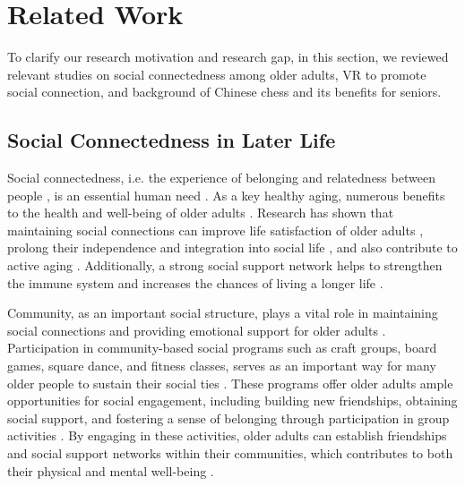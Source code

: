 \section{Related Work}
To clarify our research motivation and research gap, in this section, we reviewed relevant studies on social connectedness among older adults, VR to promote social connection, and background of Chinese chess and its benefits for seniors.

\subsection{Social Connectedness in Later Life}

Social connectedness, i.e. the experience of belonging and relatedness between people \cite{van2009social}, is an essential human need \cite{easton2013investigation}. As a key  healthy aging,   numerous benefits to the health and well-being of older adults \cite{ashida2008differential}. Research has shown that maintaining social connections can improve life satisfaction of older adults \cite{o2017definition}, prolong their independence and integration into social life \cite{michael2001living}, and also contribute to active aging \cite{annele2019definitions}. Additionally, a strong social support network helps to strengthen the immune system and increases the chances of living a longer life \cite{holt2010social}.

Community, as an important social structure, plays a vital role in maintaining social connections and providing emotional support for older adults \cite{brossoie2003community,markle2018community,salman2021community}. Participation in community-based social programs such as craft groups, board games, square dance, and fitness classes, serves as an important way for many older people to sustain their social ties \cite{agedcareguide_social_support}. These programs offer older adults ample opportunities for social engagement, including building new friendships, obtaining social support, and fostering a sense of belonging through participation in group activities \cite{lindsay2018mixed,xing2023keeping}. By engaging in these activities, older adults can establish friendships and social support networks within their communities, which contributes to both their physical and mental well-being \cite{agedcareguide_social_support,lindsay2018mixed}.


